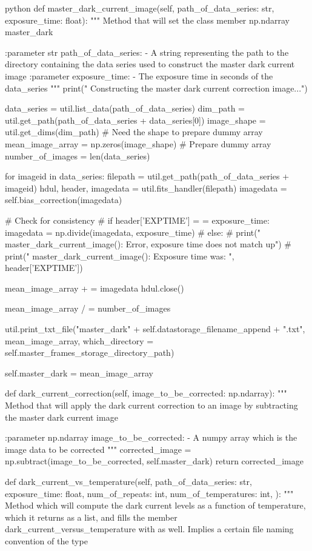 \documentclass[../main.tex]{subfiles}
\begin{document}
\begin{mintedbox}{python}
def master_dark_current_image(self, path_of_data_series: str, exposure_time: float):
"""
Method that will set the class member np.ndarray master_dark

:parameter str path_of_data_series:
- A string representing the path to the directory
containing the data series used to construct the
master dark current image
:parameter exposure_time:
- The exposure time in seconds of the data_series
"""
print(" Constructing the master dark current correction image...")

data_series  =  util.list_data(path_of_data_series)
dim_path  =  util.get_path(path_of_data_series + data_series[0])
image_shape  =  util.get_dims(dim_path)  # Need the shape to prepare dummy array
mean_image_array  =  np.zeros(image_shape)  # Prepare dummy array
number_of_images  =  len(data_series)

for imageid in data_series:
filepath  =  util.get_path(path_of_data_series + imageid)
hdul, header, imagedata  =  util.fits_handler(filepath)
imagedata  =  self.bias_correction(imagedata)

# Check for consistency
# if header['EXPTIME']  =  =  exposure_time:
imagedata  =  np.divide(imagedata, exposure_time)
# else:
#   print("  master_dark_current_image(): Error, exposure time does not match up")
#  print("  master_dark_current_image(): Exposure time was: ", header['EXPTIME'])

mean_image_array + =  imagedata
hdul.close()

mean_image_array / =  number_of_images

util.print_txt_file("master_dark" + self.datastorage_filename_append + ".txt", mean_image_array,
which_directory = self.master_frames_storage_directory_path)

self.master_dark  =  mean_image_array

def dark_current_correction(self, image_to_be_corrected: np.ndarray):
"""
Method that will apply the dark current correction to an image
by subtracting the master dark current image

:parameter np.ndarray image_to_be_corrected:
- A numpy array which is the image data to be corrected
"""
corrected_image  =  np.subtract(image_to_be_corrected, self.master_dark)
return corrected_image

def dark_current_vs_temperature(self, path_of_data_series: str, exposure_time: float, num_of_repeats: int,
num_of_temperatures: int, ):
"""
Method which will compute the dark current levels as a function
of temperature, which it returns as a list, and fills the member
dark_current_versus_temperature with as well. Implies a certain
file naming convention of the type


\end{mintedbox}
\end{document}
